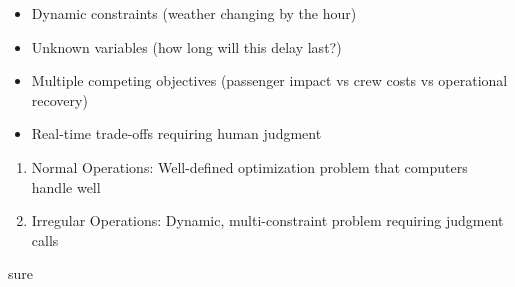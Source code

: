 \begin{botresponse}
\begin{itemize}
\item Dynamic constraints (weather changing by the hour)
\item Unknown variables (how long will this delay last?)
\item Multiple competing objectives (passenger impact vs crew costs vs operational recovery)
\item Real-time trade-offs requiring human judgment
\end{itemize}

\begin{enumerate}
\item Normal Operations: Well-defined optimization problem that computers handle well
\item Irregular Operations: Dynamic, multi-constraint problem requiring judgment calls
\end{enumerate}
\end{botresponse}

\begin{userprompt}
sure
\end{userprompt}

